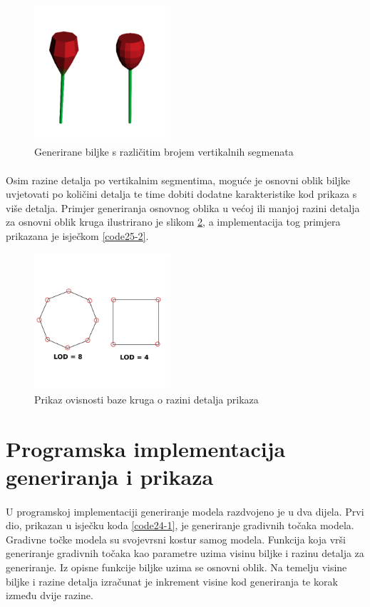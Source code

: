 \documentclass[times, utf8, diplomski]{fer}
\begin{document}
\begin{figure}[h]
	\centering
	\includegraphics[width=0.45\textwidth]{img/221-1}
	\caption{Generirane biljke s različitim brojem vertikalnih segmenata}
	\label{fig:221-1}
\end{figure}

\paragraph{}
Osim razine detalja po vertikalnim segmentima, moguće je osnovni oblik biljke uvjetovati po 
količini detalja te time dobiti dodatne karakteristike kod prikaza s više detalja. Primjer 
generiranja osnovnog oblika u većoj ili manjoj razini detalja za osnovni oblik kruga 
ilustrirano je slikom \ref{fig:221-2}, a implementacija tog primjera prikazana je isječkom 
\ref{code25-2}.

\begin{figure}[h]
	\centering
	\includegraphics[width=0.45\textwidth]{img/221-2}
	\caption{Prikaz ovisnosti baze kruga o razini detalja prikaza}
	\label{fig:221-2}
\end{figure}

\section{Programska implementacija generiranja i prikaza}
\paragraph{}
U programskoj implementaciji generiranje modela razdvojeno je u dva dijela. Prvi dio, prikazan u isječku koda \ref{code24-1}, je generiranje gradivnih točaka modela. Gradivne točke modela su svojevrsni kostur samog modela. Funkcija koja vrši generiranje gradivnih točaka kao parametre uzima visinu biljke i razinu detalja za generiranje. Iz opisne funkcije biljke uzima se osnovni oblik. Na temelju visine biljke i razine detalja izračunat je inkrement visine kod generiranja te korak između dvije razine.
\end{document}
